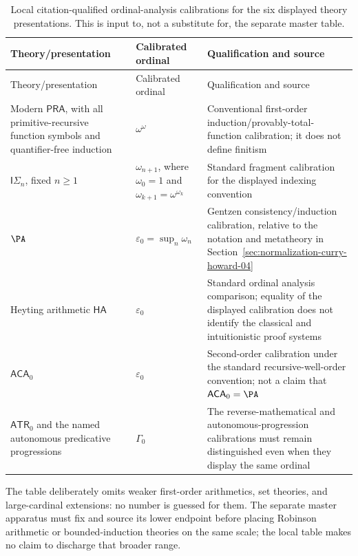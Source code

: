 \begingroup\small
\begin{longtable}{@{}p{}p{}p{}@{}}
\caption{Local citation-qualified ordinal-analysis calibrations for the six
displayed theory presentations.  This is input to, not a substitute for, the
separate master table.}
\label{tab:p07-ordinal-calibration}\\
\toprule
Theory/presentation & Calibrated ordinal & Qualification and source \\
\midrule
\endfirsthead
\toprule
Theory/presentation & Calibrated ordinal & Qualification and source \\
\midrule
\endhead
Modern \(\mathsf{PRA}\), with all primitive-recursive function symbols and
quantifier-free induction & \(\omega^\omega\) & Conventional first-order
induction/provably-total-function calibration; it does not define finitism
\cite{Pohlers2009} \\
\(\mathsf I\Sigma_n\), fixed \(n\geq1\) & \(\omega_{n+1}\), where
\(\omega_0=1\) and \(\omega_{k+1}=\omega^{\omega_k}\) & Standard
fragment calibration for the displayed indexing convention
\cite{Pohlers2009} \\
\(\PA\) & \(\varepsilon_0=\sup_n\omega_n\) & Gentzen
consistency/induction calibration, relative to the notation and metatheory in
Section~\ref{sec:normalization-curry-howard-04}
\cite{Gentzen1936,TroelstraSchwichtenberg2000} \\
Heyting arithmetic \(\mathsf{HA}\) & \(\varepsilon_0\) & Standard ordinal
analysis comparison; equality of the displayed calibration does not identify
the classical and intuitionistic proof systems \cite{Pohlers2009} \\
\(\mathsf{ACA}_0\) & \(\varepsilon_0\) & Second-order calibration under the
standard recursive-well-order convention; not a claim that
\(\mathsf{ACA}_0=\PA\) \cite{Simpson2009,Pohlers2009} \\
\(\mathsf{ATR}_0\) and the named autonomous predicative progressions &
\(\Gamma_0\) & The reverse-mathematical and autonomous-progression
calibrations must remain distinguished even when they display the same
ordinal \cite{Feferman1964,Schuette1977,Simpson2009} \\
\bottomrule
\end{longtable}
\endgroup

The table deliberately omits weaker first-order arithmetics, set theories,
and large-cardinal extensions: no number is guessed for them.  The separate
master apparatus must fix and source its lower endpoint before placing
Robinson arithmetic or bounded-induction theories on the same scale; the local
table makes no claim to discharge that broader range.

